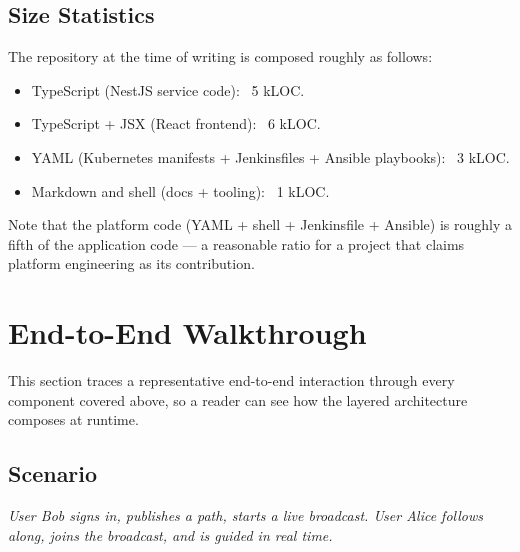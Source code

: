 \documentclass[11pt,a4paper]{article}
\begin{document}
\subsection{Size Statistics}
The repository at the time of writing is composed roughly as follows:

\begin{itemize}[leftmargin=*]
  \item TypeScript (NestJS service code): ~5 kLOC.
  \item TypeScript + JSX (React frontend): ~6 kLOC.
  \item YAML (Kubernetes manifests + Jenkinsfiles + Ansible
        playbooks): ~3 kLOC.
  \item Markdown and shell (docs + tooling): ~1 kLOC.
\end{itemize}

Note that the platform code (YAML + shell + Jenkinsfile +
Ansible) is roughly a fifth of the application code — a reasonable
ratio for a project that claims platform engineering as its
contribution.

\section{End-to-End Walkthrough}

This section traces a representative end-to-end interaction through
every component covered above, so a reader can see how the layered
architecture composes at runtime.

\subsection{Scenario}
\emph{User Bob signs in, publishes a path, starts a live broadcast.
User Alice follows along, joins the broadcast, and is guided in
real time.}
\end{document}
